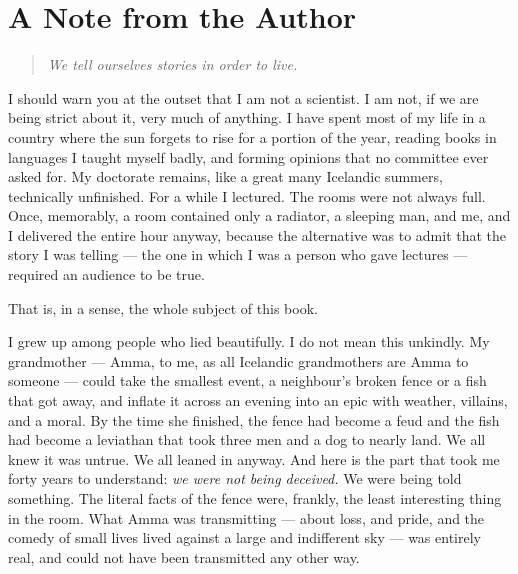 \chapter*{A Note from the Author}
{} %

\begin{quote}%
\centerline{\emph{We tell ourselves stories in order to live.}}
%
\end{quote}

I should warn you at the outset that I am not a scientist. I am not, if we are being strict about it, very much of anything. I have spent most of my life in a country where the sun forgets to rise for a portion of the year, reading books in languages I taught myself badly, and forming opinions that no committee ever asked for. My doctorate remains, like a great many Icelandic summers, technically unfinished. For a while I lectured. The rooms were not always full. Once, memorably, a room contained only a radiator, a sleeping man, and me, and I delivered the entire hour anyway, because the alternative was to admit that the story I was telling — the one in which I was a person who gave lectures — required an audience to be true.

That is, in a sense, the whole subject of this book.

I grew up among people who lied beautifully. I do not mean this unkindly. My grandmother — Amma, to me, as all Icelandic grandmothers are Amma to someone — could take the smallest event, a neighbour's broken fence or a fish that got away, and inflate it across an evening into an epic with weather, villains, and a moral. By the time she finished, the fence had become a feud and the fish had become a leviathan that took three men and a dog to nearly land. We all knew it was untrue. We all leaned in anyway. And here is the part that took me forty years to understand: \emph{we were not being deceived.} We were being told something. The literal facts of the fence were, frankly, the least interesting thing in the room. What Amma was transmitting — about loss, and pride, and the comedy of small lives lived against a large and indifferent sky — was entirely real, and could not have been transmitted any other way.

